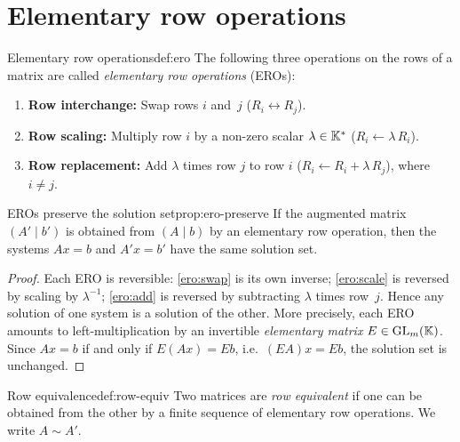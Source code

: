 \section{Elementary row operations}\label{sec:row-operations}

\begin{definition}{Elementary row operations}{def:ero}
The following three operations on the rows of a matrix are called
\emph{elementary row operations} (EROs):
\begin{enumerate}[label=(E\arabic*)]
  \item\label{ero:swap}
    \textbf{Row interchange:} Swap rows $i$ and~$j$
    \quad ($R_i \leftrightarrow R_j$).
  \item\label{ero:scale}
    \textbf{Row scaling:} Multiply row $i$ by a non-zero scalar
    $\lambda\in{\mathbb{K}}^*$ \quad ($R_i \leftarrow \lambda\,R_i$).
  \item\label{ero:add}
    \textbf{Row replacement:} Add $\lambda$ times row $j$ to row $i$
    \quad ($R_i \leftarrow R_i + \lambda\,R_j$), where $i\neq j$.
\end{enumerate}
\end{definition}

\begin{proposition}{EROs preserve the solution set}{prop:ero-preserve}
If the augmented matrix $(A'\mid b')$ is obtained from $(A\mid b)$ by
an elementary row operation, then the systems $Ax=b$ and $A'x=b'$
have the same solution set.
\end{proposition}

\begin{proof}
Each ERO is reversible: \ref{ero:swap} is its own inverse;
\ref{ero:scale} is reversed by scaling by $\lambda^{-1}$;
\ref{ero:add} is reversed by subtracting $\lambda$ times row~$j$.
Hence any solution of one system is a solution of the other.
More precisely, each ERO amounts to left-multiplication by an
invertible \emph{elementary matrix}
$E\in\operatorname{GL}_m({\mathbb{K}})$. Since $Ax = b$ if and only if $E(Ax) = Eb$, i.e.\
$(EA)x = Eb$, the solution set is unchanged.
\end{proof}

\begin{definition}{Row equivalence}{def:row-equiv}
Two matrices are \emph{row equivalent} if one can be obtained from
the other by a finite sequence of elementary row operations. We write
$A \sim A'$.
\end{definition}


